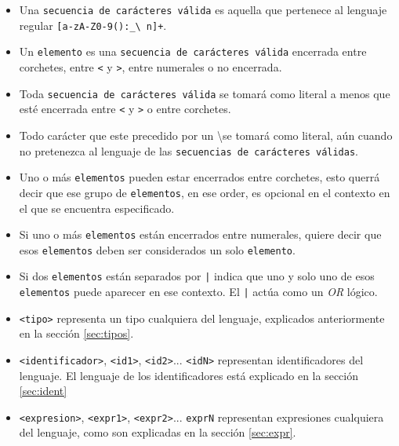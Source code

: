 \documentclass[12pt, spanish]{report}
\begin{document}
\begin{itemize}

\item Una \texttt{secuencia de car\'acteres v\'alida} es aquella que
  pertenece al lenguaje regular \texttt{[a-zA-Z0-9():\_\textbackslash
    n]+}.
       
\item Un \texttt{elemento} es una \texttt{secuencia de car\'acteres
    v\'alida} encerrada entre corchetes, entre \texttt{<} y
  \texttt{>}, entre numerales o no encerrada.
       
\item Toda \texttt{secuencia de car\'acteres v\'alida} se tomar\'a
  como literal a menos que est\'e encerrada entre \texttt{<} y
  \texttt{>} o entre corchetes.

\item Todo car\'acter que este precedido por un \textbackslash se
  tomar\'a como literal, a\'un cuando no pretenezca al lenguaje de las
  \texttt{secuencias de car\'acteres v\'alidas}.
       
\item Uno o m\'as \texttt{elementos} pueden estar encerrados entre
  corchetes, esto querr\'a decir que ese grupo de \texttt{elementos},
  en ese order, es opcional en el contexto en el que se encuentra
  especificado.
       
\item Si uno o m\'as \texttt{elementos} est\'an encerrados entre
  numerales, quiere decir que esos \texttt{elementos} deben ser
  considerados un solo \texttt{elemento}.
       
\item Si dos \texttt{elementos} est\'an separados por \texttt{|}
  indica que uno y solo uno de esos \texttt{elementos} puede aparecer
  en ese contexto. El \texttt{|} actúa como un \emph{OR} lógico.
       
\item \texttt{<tipo>} representa un tipo cualquiera del lenguaje,
  explicados anteriormente en la secci\'on \ref{sec:tipos}.
       
\item \texttt{<identificador>}, \texttt{<id1>}, \texttt{<id2>}...
  \texttt{<idN>} representan identificadores del lenguaje. El lenguaje
  de los identificadores est\'a explicado en la secci\'on
  \ref{sec:ident}
       
\item \texttt{<expresion>}, \texttt{<expr1>}, \texttt{<expr2>}...
  \texttt{exprN} representan expresiones cualquiera del lenguaje, como
  son explicadas en la secci\'on \ref{sec:expr}.


\end{itemize}
\end{document}
